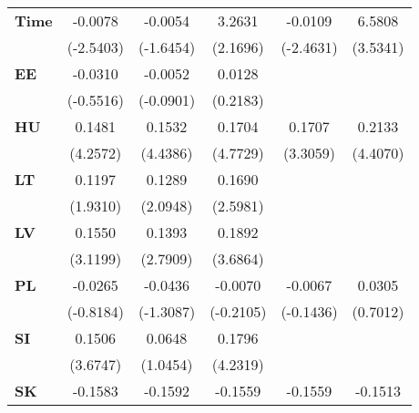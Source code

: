 \documentclass{article}
\begin{document}
\begin{table}[!htbp]
{\begin{tabular}{lccccc}
\textbf{Time}                 &     -0.0078     &        -0.0054        &      3.2631      &      -0.0109      &         6.5808         \\
\textbf{ }                     &    (-2.5403)    &       (-1.6454)       &     (2.1696)     &     (-2.4631)     &        (3.5341)        \\
\textbf{EE}            &     -0.0310     &        -0.0052        &      0.0128      &                   &                        \\
\textbf{ }                     &    (-0.5516)    &       (-0.0901)       &     (0.2183)     &                   &                        \\
\textbf{HU}            &      0.1481     &         0.1532        &      0.1704      &       0.1707      &         0.2133         \\
\textbf{ }                     &     (4.2572)    &        (4.4386)       &     (4.7729)     &      (3.3059)     &        (4.4070)        \\
\textbf{LT}            &      0.1197     &         0.1289        &      0.1690      &                   &                        \\
\textbf{ }                     &     (1.9310)    &        (2.0948)       &     (2.5981)     &                   &                        \\
\textbf{LV}            &      0.1550     &         0.1393        &      0.1892      &                   &                        \\
\textbf{ }                     &     (3.1199)    &        (2.7909)       &     (3.6864)     &                   &                        \\
\textbf{PL}            &     -0.0265     &        -0.0436        &     -0.0070      &      -0.0067      &         0.0305         \\
\textbf{ }                     &    (-0.8184)    &       (-1.3087)       &    (-0.2105)     &     (-0.1436)     &        (0.7012)        \\
\textbf{SI}            &      0.1506     &         0.0648        &      0.1796      &                   &                        \\
\textbf{ }                     &     (3.6747)    &        (1.0454)       &     (4.2319)     &                   &                        \\
\textbf{SK}            &     -0.1583     &        -0.1592        &     -0.1559      &      -0.1559      &        -0.1513         \\

\end{tabular}}
\end{table}
\end{document}
